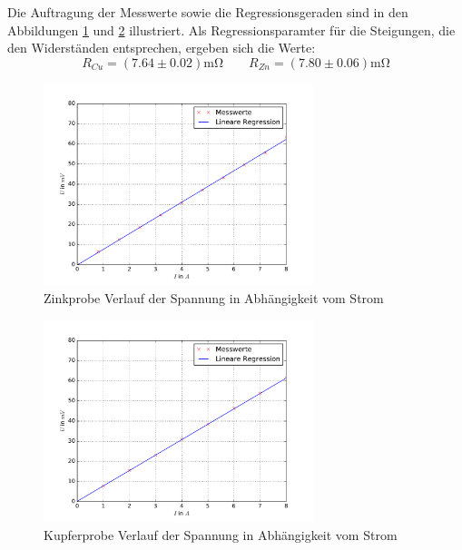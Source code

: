 Die Auftragung der Messwerte sowie die Regressionsgeraden sind in den Abbildungen \ref{fig: uri_zink} und \ref{fig: uri_kupfer} illustriert.
Als Regressionsparamter für die Steigungen, die den Widerständen entsprechen, ergeben sich die Werte:
\begin{equation}
  R_{Cu} = (7.64 \pm 0.02)\si{\milli \ohm} \quad \quad R_{Zn} = (7.80 \pm 0.06)\si{\milli \ohm}%
  \label{eq: widerstand}
\end{equation}
\FloatBarrier
\begin{figure}
  \centering
  \includegraphics[width=0.7\textwidth]{pics/uri_zink.pdf}
  \caption{Zinkprobe Verlauf der Spannung in Abhängigkeit vom Strom}
  \label{fig: uri_zink}
\end{figure}
\begin{figure}
  \centering
  \includegraphics[width=0.7\textwidth]{pics/uri_kupfer.pdf}
  \caption{Kupferprobe Verlauf der Spannung in Abhängigkeit vom Strom}
  \label{fig: uri_kupfer}
\end{figure}



